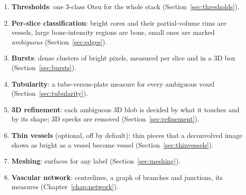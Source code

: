 \begin{enumerate}
  \item \textbf{Thresholds}: one 3-class Otsu for the whole stack (Section~\ref{sec:thresholds}).
  \item \textbf{Per-slice classification}: bright cores and their partial-volume rims are vessels,
        large bone-intensity regions are bone, small ones are marked \emph{ambiguous}
        (Section~\ref{sec:edges}).
  \item \textbf{Bursts}: dense clusters of bright pixels, measured per slice and in a 3D box
        (Section~\ref{sec:bursts}).
  \item \textbf{Tubularity}: a tube-versus-plate measure for every ambiguous voxel
        (Section~\ref{sec:tubularity}).
  \item \textbf{3D refinement}: each ambiguous 3D blob is decided by what it touches and by its shape;
        3D specks are removed (Section~\ref{sec:refinement}).
  \item \textbf{Thin vessels} (optional, off by default): thin pieces that a deconvolved image shows
        as bright as a vessel become vessel (Section~\ref{sec:thinvessels}).
  \item \textbf{Meshing}: surfaces for any label (Section~\ref{sec:meshing}).
  \item \textbf{Vascular network}: centrelines, a graph of branches and junctions, its measures
        (Chapter~\ref{chap:network}).
\end{enumerate}
